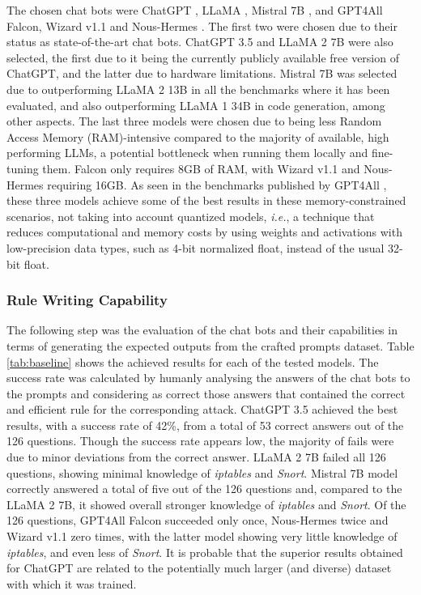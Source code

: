 \documentclass[sigconf]{acmart}
\begin{document}
The chosen chat bots were ChatGPT \cite{OpenAI22}, LLaMA \cite{Meta23}, Mistral 7B \cite{Jiang23}, and GPT4All Falcon, Wizard v1.1 and Nous-Hermes \cite{Anand23}. The first two were chosen due to their status as state-of-the-art chat bots. ChatGPT 3.5 and LLaMA 2 7B were also selected, the first due to it being the currently publicly available free version of ChatGPT, and the latter due to hardware limitations. Mistral 7B was selected due to outperforming LLaMA 2 13B in all the benchmarks where it has been evaluated, and also outperforming LLaMA 1 34B in code generation, among other aspects. The last three models were chosen due to being less Random Access Memory (RAM)-intensive compared to the majority of available, high performing LLMs, a potential bottleneck when running them locally and fine-tuning them. Falcon only requires 8GB of RAM, with Wizard v1.1 and Nous-Hermes requiring 16GB. As seen in the benchmarks published by GPT4All \cite{Anand23}, these three models achieve some of the best results in these memory-constrained scenarios, not taking into account quantized models, \textit{i.e.}, a technique that reduces computational and memory costs by using weights and activations with low-precision data types, such as 4-bit normalized float, instead of the usual 32-bit float.

\subsubsection{Rule Writing Capability}
The following step was the evaluation of the chat bots and their capabilities in terms of generating the expected outputs from the crafted prompts dataset. Table \ref{tab:baseline} shows the achieved results for each of the tested models. The success rate was calculated by humanly analysing the answers of the chat bots to the prompts and considering as correct those answers that contained the correct and efficient rule for the corresponding attack. ChatGPT 3.5 achieved the best results, with a success rate of 42\%, from a total of 53 correct answers out of the 126 questions. Though the success rate appears low, the majority of fails were due to minor deviations from the correct answer. LLaMA 2 7B failed all 126 questions, showing minimal knowledge of \textit{iptables} and \textit{Snort}. Mistral 7B model correctly answered a total of five out of the 126 questions and, compared to the LLaMA 2 7B, it showed overall stronger knowledge of \textit{iptables} and \textit{Snort}. Of the 126 questions, GPT4All Falcon succeeded only once, Nous-Hermes twice and Wizard v1.1 zero times, with the latter model showing very little knowledge of \textit{iptables}, and even less of \textit{Snort}. It is probable that the superior results obtained for ChatGPT are related to the potentially much larger (and diverse) dataset with which it was trained.
\end{document}
